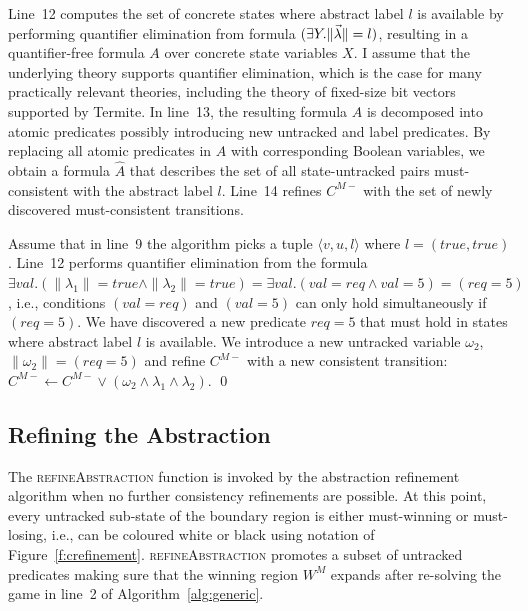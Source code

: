 Line~12 computes the set of concrete states where abstract label $l$ is available by performing quantifier elimination from formula $(\exists Y.\|\vec{\lambda}\|=l)$, resulting in a quantifier-free formula $A$ over concrete state variables $X$.  I assume that the underlying theory supports quantifier elimination, which is the case for many practically relevant theories, including the theory of fixed-size bit vectors supported by Termite.  In line~13, the resulting formula $A$ is decomposed into atomic predicates possibly introducing new untracked and label predicates.  By replacing all atomic predicates in $A$ with corresponding Boolean variables, we obtain a formula $\hat{A}$ that describes the set of all state-untracked pairs must-consistent with the abstract label $l$.  Line~14 refines $C^{M-}$ with the set of newly discovered must-consistent transitions.


\begin{ex}
    \everymath{\mathtt{\xdef\tmp{\fam\the\fam\relax}\aftergroup\tmp}}
    \everydisplay{\mathtt{\xdef\tmp{\fam\the\fam\relax}\aftergroup\tmp}}
    Assume that in line~9 the algorithm picks a tuple $\langle v,u,l\rangle$ where $l=(true, true)$.  Line~12 performs quantifier elimination from the formula $\exists val. (\|\lambda_1\|=true \land  \|\lambda_2\|=true) = \exists val. (val=req \land val=5) = (req=5)$, i.e., conditions $(val=req)$ and $(val=5)$ can only hold simultaneously if $(req=5)$. We have discovered a new predicate $req=5$ that must hold in states where abstract label $l$ is available.  We introduce a new untracked variable $\omega_2$, $\|\omega_2\|=(req=5)$ and refine $C^{M-}$ with a new consistent transition: $C^{M-} \gets C^{M-} \lor (\omega_2 \land \lambda_1 \land \lambda_2)$.
    \qed
\end{ex}

\subsection{Refining the Abstraction}
\label{sec:refineAbstraction}

The \textsc{refineAbstraction} function is invoked by the abstraction refinement algorithm when no further consistency refinements are possible.  At this point, every untracked sub-state of the boundary region is either must-winning or must-losing, i.e., can be coloured white or black using notation of Figure~\ref{f:crefinement}.  \textsc{refineAbstraction} promotes a subset of untracked predicates making sure that the winning region $W^M$ expands after re-solving the game in line~2 of Algorithm~\ref{alg:generic}.  

